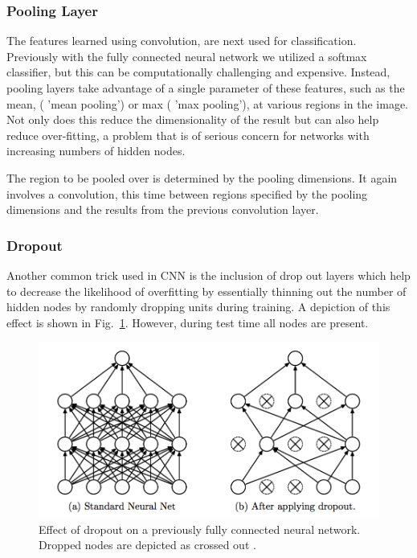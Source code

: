 \documentclass[12pt, twocolumn]{article}
\begin{document}
\subsubsection{Pooling Layer}
The features learned using convolution, are next used for classification. Previously with the fully connected neural network we utilized a softmax classifier, but this can be computationally challenging and expensive. Instead, pooling layers take advantage of a single parameter of these features, such as the mean, ( 'mean pooling') or max ( 'max pooling'), at  various regions in the image. Not only does this reduce the dimensionality of the result but can also help reduce over-fitting, a problem that is of serious concern for networks with increasing numbers of hidden nodes. 

The region to be pooled over is determined by the pooling dimensions. It again involves a convolution, this time between regions specified by the pooling dimensions and the results from the previous convolution layer. 

\subsubsection{Dropout}

Another common trick used in CNN is the inclusion of drop out layers which help to decrease the likelihood of overfitting by essentially thinning out the number of hidden nodes by randomly dropping units during training.  A depiction of this effect is shown in Fig.~\ref{fig:dropout}. However, during test time all nodes are present. 
\begin{figure}
\includegraphics[scale=.52]{dropout.png}

\caption{Effect of dropout on a previously fully connected neural network. Dropped nodes are depicted as crossed out \cite{Dropout}. }
\label{fig:dropout}
\end{figure}
\end{document}
